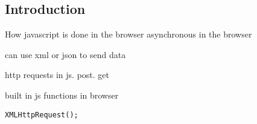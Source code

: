 
\subsection{Introduction}

How javascript is done in the browser
asynchronous in the browser

can use xml or json to send data

http requests in js. post. get

built in js functions in browser

\begin{verbatim}
XMLHttpRequest();
\end{verbatim}

